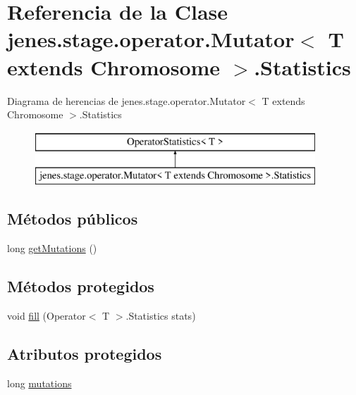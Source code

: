 \hypertarget{classjenes_1_1stage_1_1operator_1_1_mutator_3_01_t_01extends_01_chromosome_01_4_1_1_statistics}{\section{Referencia de la Clase jenes.\-stage.\-operator.\-Mutator$<$ T extends Chromosome $>$.Statistics}
\label{classjenes_1_1stage_1_1operator_1_1_mutator_3_01_t_01extends_01_chromosome_01_4_1_1_statistics}
}
Diagrama de herencias de jenes.\-stage.\-operator.\-Mutator$<$ T extends Chromosome $>$.Statistics\begin{figure}[H]
\begin{center}
\leavevmode
\includegraphics[height=2.000000cm]{classjenes_1_1stage_1_1operator_1_1_mutator_3_01_t_01extends_01_chromosome_01_4_1_1_statistics}
\end{center}
\end{figure}
\subsection*{Métodos públicos}
\begin{DoxyCompactItemize}
\item 
long \hyperlink{classjenes_1_1stage_1_1operator_1_1_mutator_3_01_t_01extends_01_chromosome_01_4_1_1_statistics_afc74de8d8cf1b0d1cdaf9ec3a170c80e}{get\-Mutations} ()
\end{DoxyCompactItemize}
\subsection*{Métodos protegidos}
\begin{DoxyCompactItemize}
\item 
void \hyperlink{classjenes_1_1stage_1_1operator_1_1_mutator_3_01_t_01extends_01_chromosome_01_4_1_1_statistics_af114cf6ccf66e1bd5d5d7337b4e15e28}{fill} (Operator$<$ T $>$.Statistics stats)
\end{DoxyCompactItemize}
\subsection*{Atributos protegidos}
\begin{DoxyCompactItemize}
\item 
long \hyperlink{classjenes_1_1stage_1_1operator_1_1_mutator_3_01_t_01extends_01_chromosome_01_4_1_1_statistics_a4328be89d9643f783f5c08164a0aa916}{mutations}
\end{DoxyCompactItemize}


